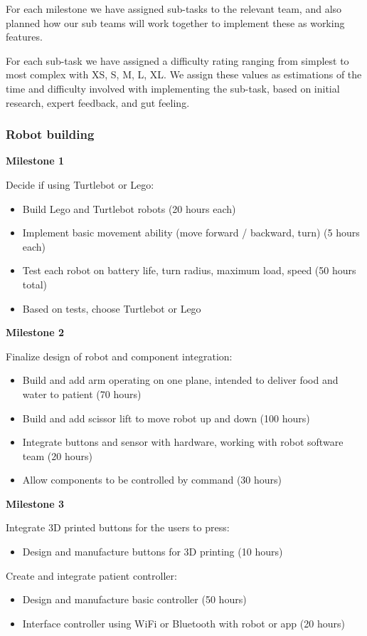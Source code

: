 \documentclass{article}
\begin{document}
For each milestone we have assigned sub-tasks to the relevant team, and also planned how our sub teams will work together to implement these as working features.

For each sub-task we have assigned a difficulty rating ranging from simplest to most complex with XS, S, M, L, XL. We assign these values as estimations of the time and difficulty involved with implementing the sub-task, based on initial research, expert feedback, and gut feeling. 


\subsubsection{Robot building}
{\bf Milestone 1}

Decide if using Turtlebot or Lego:
\begin{itemize}
\item Build Lego and Turtlebot robots (20 hours each)
\item Implement basic movement ability (move forward / backward, turn) (5 hours each)
\item Test each robot on battery life, turn radius, maximum load, speed (50 hours total)
\item Based on tests, choose Turtlebot or Lego
\end{itemize}

{\bf Milestone 2}

Finalize design of robot and component integration:
\begin{itemize}
\item Build and add arm operating on one plane, intended to deliver food and water to patient (70 hours)
\item Build and add scissor lift to move robot up and down (100 hours)
\item Integrate buttons and sensor with hardware, working with robot software team (20 hours)
\item Allow components to be controlled by command (30 hours)
\end{itemize}

{\bf Milestone 3}

Integrate 3D printed buttons for the users to press:
\begin{itemize}
\item Design and manufacture buttons for 3D printing (10 hours)
\end{itemize}

Create and integrate patient controller:
\begin{itemize}
  \item Design and manufacture basic controller (50 hours)
  \item Interface controller using WiFi or Bluetooth with robot or app (20 hours)
\end{itemize}
\end{document}
